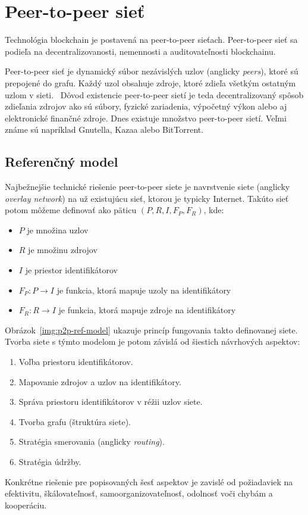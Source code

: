 \section{Peer-to-peer sieť}\label{sec:p2p}

Technológia blockchain je postavená na peer-to-peer sieťach. Peer-to-peer sieť sa podieľa na decentralizovanosti, nemennosti a auditovateľnosti blockchainu. 

Peer-to-peer sieť je dynamický súbor nezávislých uzlov (anglicky \textit{peers}), ktoré sú prepojené do grafu. Každý uzol obsahuje zdroje, ktoré zdieľa všetkým ostatným uzlom v sieti.~\cite{p2pBuford, p2pSchollmeier} Dôvod existencie peer-to-peer sietí je teda decentralizovaný spôsob zdieľania zdrojov ako sú súbory, fyzické zariadenia, výpočetný výkon alebo aj elektronické finančné zdroje. Dnes existuje množstvo peer-to-peer sietí. Veľmi známe sú napríklad Gnutella, Kazaa alebo BitTorrent.~\cite{p2pEssence}

\subsection{Referenčný model}
Najbežnejšie technické riešenie peer-to-peer siete je navrstvenie siete (anglicky \textit{overlay network}) na už existujúcu sieť, ktorou je typicky Internet. Takúto sieť potom môžeme definovať ako päticu $(P,R,I,F_P,F_R)$, kde:
\begin{itemize}
	\item $P$ je množina uzlov
	\item $R$ je množinu zdrojov
	\item $I$ je priestor identifikátorov
	\item $F_P: P \rightarrow I$ je funkcia, ktorá mapuje uzoly na identifikátory
	\item $F_R: R \rightarrow I$ je funkcia, ktorá mapuje zdroje na identifikátory
\end{itemize}

Obrázok~\ref{img:p2p-ref-model} ukazuje princíp fungovania takto definovanej siete. Tvorba siete s týmto modelom je potom závislá od šiestich návrhových aspektov:
\begin{enumerate}
	\item Voľba priestoru identifikátorov.
	\item Mapovanie zdrojov a uzlov na identifikátory.
	\item Správa priestoru identifikátorov v réžii uzlov siete.
	\item Tvorba grafu (štruktúra siete).
	\item Stratégia smerovania (anglicky \textit{routing}).
	\item Stratégia údržby.
\end{enumerate}
Konkrétne riešenie pre popisovaných šesť aspektov je zavislé od požiadaviek na efektivitu, škálovateľnosť, samoorganizovateľnosť, odolnosť voči chybám a kooperáciu.~\cite{p2pEssence}

